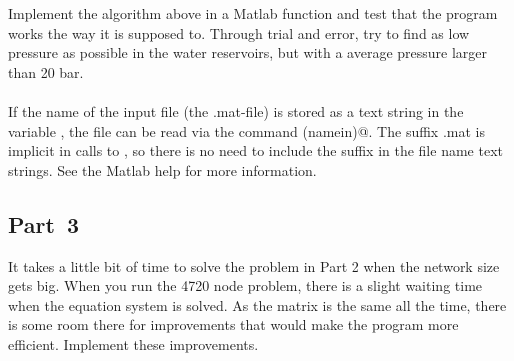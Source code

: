 \documentclass[11pt,a4paper]{article}
\begin{document}
\noindent Implement the algorithm above in a Matlab function and test that the program works the way it is supposed to. Through trial and error, try to find as low pressure as possible in the water reservoirs, but with a average pressure larger than 20 bar. \\

\medskip
{}\\
If the name of the input file (the .mat-file) is stored as a text string in the variable \verb@namein@, the file can be read via the command \verb@load(namein)@. The suffix .mat is implicit in calls to \verb@load@, so there is no need to include the suffix in the file name text strings. See the Matlab help for more information.

\subsection*{Part~3}
It takes a little bit of time to solve the problem in Part 2 when the network size gets big. When you run the 4720 node problem, there is a slight waiting time when the equation system is solved. As the matrix is the same all the time, there is some room there for improvements that would make the program more efficient. Implement these improvements.
\end{document}
